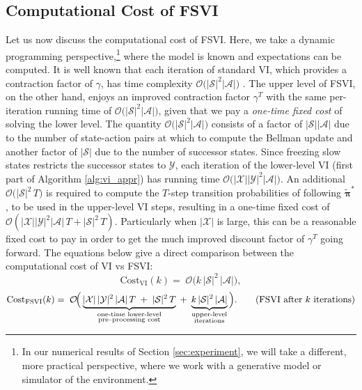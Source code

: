 \documentclass[11pt, notitlepage]{article}
\newcommand{\1}{\mathbbm{1}}
\begin{document}
\subsection{Computational Cost of FSVI}
\label{sec:runningtime}
Let us now discuss the computational cost of FSVI. Here, we take a dynamic programming perspective,\footnote{In our numerical results of Section \ref{sec:experiment}, we will take a different, more practical perspective, where we work with a generative model or simulator of the environment.} where the model is known and expectations can be computed. It is well known that each iteration of standard VI, which provides a contraction factor of $\gamma$, has time complexity $\mathcal O\bigl(|\mathcal S|^2|\mathcal A|\bigr)$ \citep{littman1995complexity}. The upper level of FSVI, on the other hand, enjoys an improved contraction factor $\gamma^T$ with the same per-iteration running time of $\mathcal O\bigl(|\mathcal S|^2|\mathcal A|\bigr)$, given that we pay a \emph{one-time fixed cost} of solving the lower level. The quantity $\mathcal O\bigl(|\mathcal S|^2|\mathcal A|\bigr)$ consists of a factor of $|\mathcal S ||\mathcal A|$ due to the number of state-action pairs at which to compute the Bellman update and another factor of $|\mathcal S|$ due to the number of successor states. Since freezing slow states restricts the successor states to $\mathcal Y$, each iteration of the lower-level VI (first part of Algorithm \ref{alg:vi_appr}) has running time $\mathcal O\bigl(|\mathcal X| |\mathcal Y|^2|\mathcal A|\bigr)$. An additional $\mathcal O\bigl(|\mathcal S|^2 \, T\bigr)$ is required to compute the $T$-step transition probabilities of following $\tilde{\boldsymbol{\pi}}^*$, to be used in the upper-level VI steps, resulting in a one-time fixed cost of $\mathcal O ( |\mathcal X| |\mathcal Y|^2|\mathcal A| \, T + |\mathcal S|^2\, T)$. Particularly when $|\mathcal X|$ is large, this can be a reasonable fixed cost to pay in order to get the much improved discount factor of $\gamma^T$ going forward. The equations below give a direct comparison between the computational cost of VI vs FSVI:
\[
\text{Cost}_{\text{VI}}(k)
=\;
\mathcal O\!\bigl(k\,|\mathcal S|^{2}\,|\mathcal A|\bigr),
\tag{VI after \(k\) iterations}
\]
\[
\text{Cost}_{\text{FSVI}}(k)
=\;
\mathcal O\!\Bigl(\,
\underbrace{|\mathcal X|\,|\mathcal Y|^{2}\,|\mathcal A|\,T
\;+\;
|\mathcal S|^{2}\,T}_{\substack{\text{one-time lower-level}\\\text{pre–processing cost}}}
\;+\;
\underbrace{k\,|\mathcal S|^{2}\,|\mathcal A|}_{\substack{\text{upper-level}\\\text{iterations}}}
\, \Bigr).
\tag{FSVI after \(k\) iterations}
\]
\end{document}
